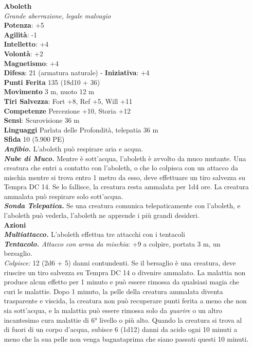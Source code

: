 \begin{multicols}{2}

\textbf{Aboleth}\\
\emph{Grande aberrazione, legale malvagio}\\
\textbf{Potenza}: +5\\
\textbf{Agilità}: -1\\
\textbf{Intelletto}: +4\\
\textbf{Volontà}: +2\\
\textbf{Magnetismo}: +4\\
\textbf{Difesa}: 21 (armatura naturale) - \textbf{Iniziativa}: +4\\
\textbf{Punti Ferita} 135 (18d10 + 36)\\
\textbf{Movimento} 3 m, nuoto 12 m\\
\textbf{Tiri Salvezza}: Fort +8, Ref +5, Will +11\\
\textbf{Competenze} Percezione +10, Storia +12\\
\textbf{Sensi}: Scurovisione 36 m\\
\textbf{Linguaggi} Parlata delle Profondità, telepatia 36 m\\
\textbf{Sfida} 10 (5.900 PE)\\
\smallskip
\emph{\textbf{Anfibio.}} L'aboleth può respirare aria e acqua.\\
\emph{\textbf{Nube di Muco.}} Mentre è sott'acqua, l'aboleth è avvolto da muco mutante. Una creatura che entri a contatto con l'aboleth, o che lo colpisca con un attacco da mischia mentre si trova entro 1 metro da esso, deve effettuare un tiro salvezza su Tempra DC 14. Se lo fallisce, la creatura resta ammalata per 1d4 ore. La creatura ammalata può respirare solo sott'acqua.\\
\emph{\textbf{Sonda Telepatica.}} Se una creatura comunica telepaticamente con l'aboleth, e l'aboleth può vederla, l'aboleth ne apprende i più grandi desideri. \\
\smallskip\textbf{Azioni}\\
\emph{\textbf{Multiattacco.}} L'aboleth effettua tre attacchi con i tentacoli\\
\emph{\textbf{Tentacolo.} Attacco con arma da mischia}: +9 a colpire, portata 3 m, un bersaglio.\\
\emph{Colpisce:} 12 (2d6 + 5) danni contundenti. Se il bersaglio è una creatura, deve riuscire un tiro salvezza su Tempra DC 14 o divenire ammalato. La malattia non produce alcun effetto per 1 minuto e può essere rimossa da qualsiasi magia che curi le malattie. Dopo 1 minuto, la pelle della creatura ammalata diventa trasparente e viscida, la creatura non può recuperare punti ferita a meno che non sia sott'acqua, e la malattia può essere rimossa solo da \emph{guarire} o un altro incantesimo cura malattie di 6° livello o più alto. Quando la creatura si trova al di fuori di un corpo d'acqua, subisce 6 (1d12) danni da acido ogni 10 minuti a meno che la sua pelle non venga bagnataprima che siano  passati questi 10 minuti. \\

\end{multicols}
